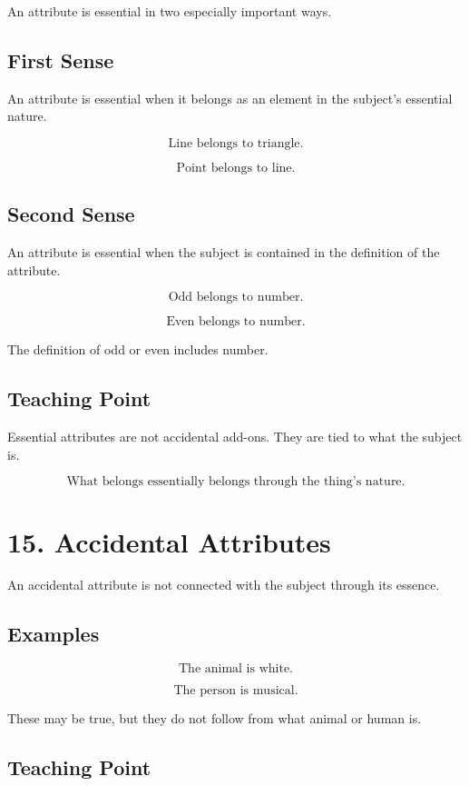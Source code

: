 \documentclass[12pt]{article}
\begin{document}
An attribute is essential in two especially important ways.

\subsection*{First Sense}

An attribute is essential when it belongs as an element in the subject's
essential nature.

\[
\text{Line belongs to triangle.}
\]

\[
\text{Point belongs to line.}
\]

\subsection*{Second Sense}

An attribute is essential when the subject is contained in the definition of the
attribute.

\[
\text{Odd belongs to number.}
\]

\[
\text{Even belongs to number.}
\]

The definition of odd or even includes number.

\subsection*{Teaching Point}

Essential attributes are not accidental add-ons. They are tied to what the
subject is.

\[
\boxed{
\text{What belongs essentially belongs through the thing's nature.}
}
\]

\section*{15. Accidental Attributes}

An accidental attribute is not connected with the subject through its essence.

\subsection*{Examples}

\[
\text{The animal is white.}
\]

\[
\text{The person is musical.}
\]

These may be true, but they do not follow from what animal or human is.

\subsection*{Teaching Point}
\end{document}
